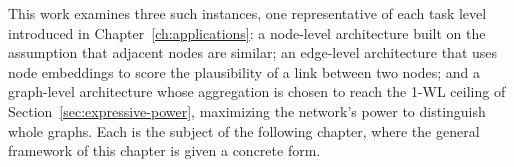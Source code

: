 This work examines three such instances, one representative of 
each task level introduced in Chapter~\ref{ch:applications}: a node-level architecture built on 
the assumption that adjacent nodes are similar;
an edge-level architecture that uses node embeddings 
to score the plausibility of a link between two nodes; and a graph-level architecture whose 
aggregation is chosen to reach the \mbox{1-WL} ceiling of Section~\ref{sec:expressive-power}, 
maximizing the network's power to distinguish whole graphs. Each is the subject of the
following chapter, where the general framework of this chapter is given a concrete form.
